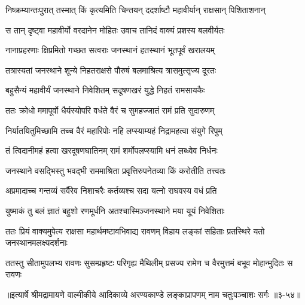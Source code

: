 \twolineshloka
{निष्क्रम्यान्तःपुरात् तस्मात् किं कृत्यमिति चिन्तयन्}
{ददर्शाष्टौ महावीर्यान् राक्षसान् पिशिताशनान्} %

\twolineshloka
{स तान् दृष्ट्वा महावीर्यो वरदानेन मोहितः}
{उवाच तानिदं वाक्यं प्रशस्य बलवीर्यतः} %

\twolineshloka
{नानाप्रहरणाः क्षिप्रमितो गच्छत सत्वराः}
{जनस्थानं हतस्थानं भूतपूर्वं खरालयम्} %

\twolineshloka
{तत्रास्यतां जनस्थाने शून्ये निहतराक्षसे}
{पौरुषं बलमाश्रित्य त्रासमुत्सृज्य दूरतः} %

\twolineshloka
{बहुसैन्यं महावीर्यं जनस्थाने निवेशितम्}
{सदूषणखरं युद्धे निहतं रामसायकैः} %

\twolineshloka
{ततः क्रोधो ममापूर्वो धैर्यस्योपरि वर्धते}
{वैरं च सुमहज्जातं रामं प्रति सुदारुणम्} %

\twolineshloka
{निर्यातयितुमिच्छामि तच्च वैरं महारिपोः}
{नहि लप्स्याम्यहं निद्रामहत्वा संयुगे रिपुम्} %

\twolineshloka
{तं त्विदानीमहं हत्वा खरदूषणघातिनम्}
{रामं शर्मोपलप्स्यामि धनं लब्ध्वेव निर्धनः} %

\twolineshloka
{जनस्थाने वसद्भिस्तु भवद्भी राममाश्रिता}
{प्रवृत्तिरुपनेतव्या किं करोतीति तत्त्वतः} %

\twolineshloka
{अप्रमादाच्च गन्तव्यं सर्वैरेव निशाचरैः}
{कर्तव्यश्च सदा यत्नो राघवस्य वधं प्रति} %

\twolineshloka
{युष्माकं तु बलं ज्ञातं बहुशो रणमूर्धनि}
{अतश्चास्मिञ्जनस्थाने मया यूयं निवेशिताः} %

\twolineshloka
{ततः प्रियं वाक्यमुपेत्य राक्षसा महार्थमष्टावभिवाद्य रावणम्}
{विहाय लङ्कां सहिताः प्रतस्थिरे यतो जनस्थानमलक्ष्यदर्शनाः} %

\twolineshloka
{ततस्तु सीतामुपलभ्य रावणः सुसम्प्रहृष्टः परिगृह्य मैथिलीम्}
{प्रसज्य रामेण च वैरमुत्तमं बभूव मोहान्मुदितः स रावणः} %


॥इत्यार्षे श्रीमद्रामायणे वाल्मीकीये आदिकाव्ये अरण्यकाण्डे लङ्काप्रापणम् नाम चतुःपञ्चाशः सर्गः ॥३-५४॥

